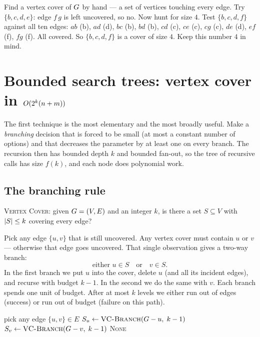\begin{labbox}
Find a vertex cover of $G$ by hand --- a set of vertices touching every edge. Try $\{b,c,d,e\}$: edge $f\,g$ is left uncovered, so no. Now hunt for size $4$. Test $\{b,c,d,f\}$ against all ten edges: $ab$ (b), $ad$ (d), $bc$ (b), $bd$ (b), $cd$ (c), $ce$ (c), $cg$ (c), $de$ (d), $ef$ (f), $fg$ (f). All covered. So $\{b,c,d,f\}$ is a cover of size $4$. Keep this number $4$ in mind.
\end{labbox}

\section{Bounded search trees: vertex cover in \texorpdfstring{$O(2^k(n+m))$}{O(2^k(n+m))}}

The first technique is the most elementary and the most broadly useful. Make a \emph{branching} decision that is forced to be small (at most a constant number of options) and that decreases the parameter by at least one on every branch. The recursion then has bounded depth $k$ and bounded fan-out, so the tree of recursive calls has size $f(k)$, and each node does polynomial work.

\subsection{The branching rule}

\textsc{Vertex Cover}: given $G=(V,E)$ and an integer $k$, is there a set $S\subseteq V$ with $\lvert S\rvert\le k$ covering every edge?

Pick any edge $\{u,v\}$ that is still uncovered. Any vertex cover must contain $u$ or $v$ --- otherwise that edge goes uncovered. That single observation gives a two-way branch:
\[
  \text{either } u\in S \quad\text{or}\quad v\in S.
\]
In the first branch we put $u$ into the cover, delete $u$ (and all its incident edges), and recurse with budget $k-1$. In the second we do the same with $v$. Each branch spends one unit of budget. After at most $k$ levels we either run out of edges (success) or run out of budget (failure on this path).

\begin{algorithm}[H]
\caption{\textsc{VC-Branch}$(\Gph,k)$ --- bounded search tree for vertex cover}
\label{ch25:alg-vcbranch}
\DontPrintSemicolon
{}
pick any edge $\{u,v\}\in E$\;
$S_u \gets \textsc{VC-Branch}(G - u,\; k-1)$\;
$S_v \gets \textsc{VC-Branch}(G - v,\; k-1)$\;
\Return \textsc{None}\;
\end{algorithm}

